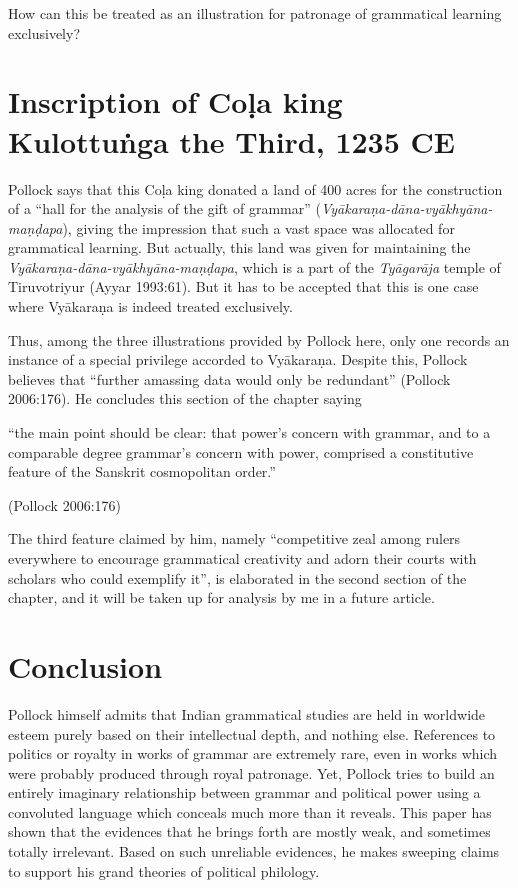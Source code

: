 How can this be treated as an illustration for patronage of grammatical learning exclusively?

\section{Inscription of Coḷa king Kulottuṅga the Third, 1235 CE}\label{chap3-sec18}

Pollock says that this Coḷa king donated a land of 400 acres for the construction of a ``hall for the analysis of the gift of grammar'' ({\sl Vyākaraṇa-dāna-vyākhyāna-maṇḍapa}), giving the impression that such a vast space was allocated for grammatical learning. But actually, this land was given for maintaining the {\sl Vyākaraṇa-dāna-vyākhyāna-maṇḍapa}, which is a part of the {\sl Tyāgarāja} temple of Tiruvotriyur (Ayyar 1993:61). But it has to be accepted that this is one case where Vyākaraṇa is indeed treated exclusively.

Thus, among the three illustrations provided by Pollock here, only one records an instance of a special privilege accorded to Vyākaraṇa. Despite this, Pollock believes that ``further amassing data would only be redundant'' (Pollock 2006:176). He concludes this section of the chapter saying
\begin{myquote}
``the main point should be clear: that power’s concern with grammar, and to a comparable degree grammar's concern with power, comprised a constitutive feature of the Sanskrit cosmopolitan order.''

\hfill (Pollock 2006:176)
\end{myquote}
The third feature claimed by him, namely ``competitive zeal among rulers everywhere to encourage grammatical creativity and adorn their courts with scholars who could exemplify it'', is elaborated in the second section of the chapter, and it will be taken up for analysis by me in a future article.

\section*{Conclusion}

Pollock himself admits that Indian grammatical studies are held in worldwide esteem purely based on their intellectual depth, and nothing else. References to politics or royalty in works of grammar are extremely rare, even in works which were probably produced through royal patronage. Yet, Pollock tries to build an entirely imaginary relationship between grammar and political power using a convoluted language which conceals much more than it reveals. This paper has shown that the evidences that he brings forth are mostly weak, and sometimes totally irrelevant. Based on such unreliable evidences, he makes sweeping claims to support his grand theories of political philology. 

